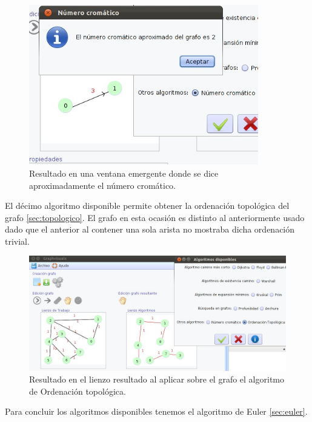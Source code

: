 \begin{figure}[H]
\begin{center}
\includegraphics[width=10cm]{./imagenes_documentacion/imagen_numero_cromatico.jpeg}
\caption{Resultado en una ventana emergente donde se dice aproximadamente el número cromático.}
\end{center}
\end{figure}
\newpage
El décimo algoritmo disponible permite obtener la ordenación topológica del grafo \ref{sec:topologico}. El grafo en esta ocasión es distinto al anteriormente usado dado que el anterior al contener una sola arista no mostraba dicha ordenación trivial. \\

\begin{figure}[H]
\begin{center}
\includegraphics[width=13cm]{./imagenes_documentacion/imagen_ordenacion_topologica_y_resultado.jpeg}
\caption{Resultado en el lienzo resultado al aplicar sobre el grafo el algoritmo de Ordenación topológica.}
\end{center}
\end{figure}

Para concluir los algoritmos disponibles tenemos el algoritmo de Euler \ref{sec:euler}.

